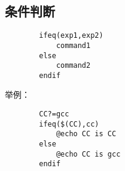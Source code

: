 \documentclass{article}
\begin{document}
\begin{CJK}{UTF8}{gbsn}
	\subsection{条件判断}
	\begin{verbatim}
		ifeq(exp1,exp2)
		    command1
		else
		    command2
		endif
	\end{verbatim}
	举例：
	\begin{verbatim}
		CC?=gcc
		ifeq($(CC),cc)
		    @echo CC is CC
		else
		    @echo CC is gcc
		endif
	\end{verbatim}
\end{CJK}
\end{document}
